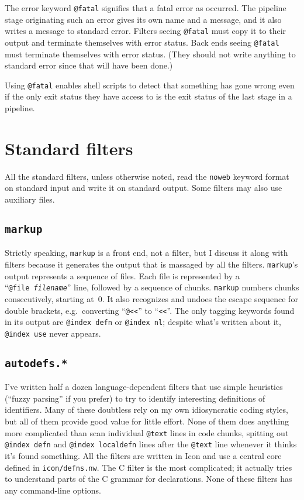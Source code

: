 \documentclass{article}
\makeatletter
\newcommand\kw[1]{\texttt{@#1}}
\newcommand\ikw[1]{\kw{index~#1}}
\makeatother
\begin{document}
The error keyword \kw{fatal} signifies that a fatal error as
occurred.
The pipeline stage originating such an error gives its own name and a
message, and it also writes a message to standard error.
Filters seeing \kw{fatal} must copy it to their output and terminate
themselves with error status.
Back ends seeing \kw{fatal} must terminate themselves with error
status. (They should not write anything to standard error since that
will have been done.)

Using \kw{fatal} enables shell scripts to detect
that something has gone wrong even if the only exit status they have
access to is the
exit status of the last stage in a pipeline.

\section{Standard filters}

All the standard filters, unless otherwise noted, read the {\tt noweb}
keyword format on standard input and write it on standard output.
Some filters may also use auxiliary files.

\subsection{\tt markup}

Strictly speaking, {\tt markup} is a front end, not a filter, but I
discuss it along with filters because it generates the output that is
massaged by all the filters.
{\tt markup}'s output represents a sequence of files.
Each file is represented by a ``{\tt @file~{\rm\it filename}}'' line,
followed by a sequence of chunks.
{\tt markup} numbers chunks consecutively, starting at~0.
It also recognizes and undoes the escape sequence for double brackets,
e.g.~converting ``{\tt @<<}'' to ``{\tt <<}''.
The only tagging keywords found in its output are \ikw{defn} or
\ikw{nl}; despite what's written about it, \ikw{use} never appears.

\subsection{\tt autodefs.*}

I've written half a dozen language-dependent filters that use simple
heuristics (``fuzzy parsing'' if you prefer) to try to identify
interesting definitions of identifiers.
Many of these doubtless rely on my own idiosyncratic coding styles,
but all of them provide good value for little effort.
None of them does anything more complicated than scan individual
\kw{text} lines in code chunks, spitting out \ikw{defn}
and \ikw{localdefn} lines after
the \kw{text} line whenever it thinks it's found something.
All the filters are written in Icon and use a central core defined in
\verb+icon/defns.nw+. 
The C filter is the most complicated; it actually tries to understand
parts of the C grammar for declarations.
None of these filters has any command-line options.
\end{document}
